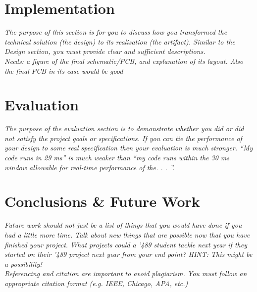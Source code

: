 \documentclass[conference]{IEEEtran}
\begin{document}
\section{Implementation}

\textit{The purpose of this section is for you to discuss how you transformed the technical solution (the design) to its realisation (the artifact). Similar to the Design section, you must provide clear and sufficient descriptions.} \\

\textit{Needs: a figure of the final schematic/PCB, and explanation of its layout. Also the final PCB in its case would be good}

\section{Evaluation}

\textit{The purpose of the evaluation section is to demonstrate whether you did or did not satisfy the project goals or specifications. If you can tie the performance of your design to some real specification then your evaluation is much stronger. “My code runs in 29 ms” is much weaker than “my code runs within the 30 ms window allowable for real-time performance of the. . . ”.} \\



\section{Conclusions \& Future Work}

\textit{Future work should not just be a list of things that you would have done if you had a little more time. Talk about new things that are possible now that you have finished your project. What projects could a ’489 student tackle next year if they started on their '489 project next year from your end point? HINT: This might be a possibility!} \\









\textit{Referencing and citation are important to avoid plagiarism. You must follow an appropriate citation format (e.g. IEEE, Chicago, APA, etc.)} \\
\end{document}
